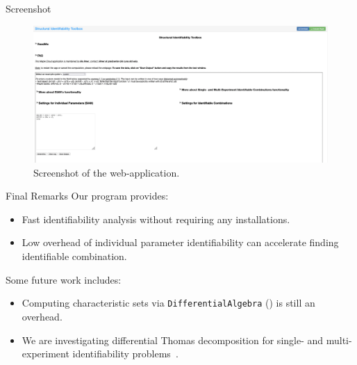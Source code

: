 \documentclass[final,hyperref={pdfpagelabels=false}]{beamer}
\begin{document}
\begin{frame}[t]
\begin{columns}[t]
\begin{column}{.465\textwidth}

            \begin{block}{Screenshot}

                \begin{figure}
                    \includegraphics[width=\linewidth]{screenshot.png}
                    \caption{Screenshot of the web-application.}
                \end{figure}

            \end{block}


            \begin{block}{Final Remarks}
                Our program provides:
                \begin{itemize}
                    \item Fast identifiability analysis without requiring any installations.
                    \item Low overhead of individual parameter identifiability can accelerate finding identifiable combination.
                \end{itemize}
                Some future work includes:
                \begin{itemize}
                    \item Computing characteristic sets via {\tt DifferentialAlgebra} (\cite{boulier2004blad}) is still an overhead.
                    \item We are investigating differential Thomas decomposition for single- and multi-experiment identifiability problems~\cite{gerdt2019maple}.
                \end{itemize}


\end{block}
\end{column}
\end{columns}
\end{frame}
\end{document}
